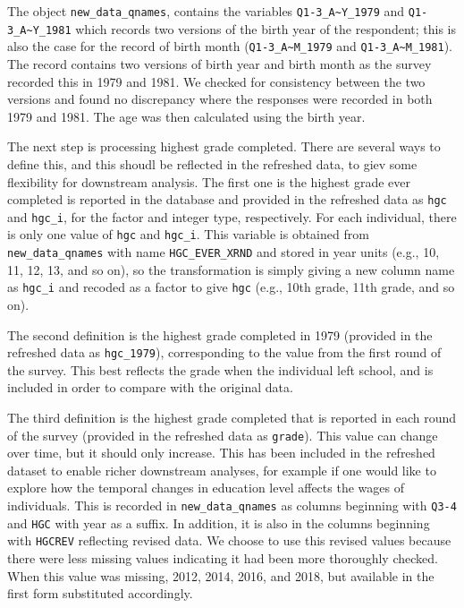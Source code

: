 \documentclass{article}
\begin{document}
The object \texttt{new\_data\_qnames}, contains the variables \texttt{Q1-3\_A\textasciitilde{}Y\_1979} and \texttt{Q1-3\_A\textasciitilde{}Y\_1981} which records two versions of the birth year of the respondent; this is also the case for the record of birth month (\texttt{Q1-3\_A\textasciitilde{}M\_1979} and \texttt{Q1-3\_A\textasciitilde{}M\_1981}). The record contains two versions of birth year and birth month as the survey recorded this in 1979 and 1981. We checked for consistency between the two versions and found no discrepancy where the responses were recorded in both 1979 and 1981. The age was then calculated using the birth year.

The next step is processing highest grade completed. There are several ways to define this, and this shoudl be reflected in the refreshed data, to giev some flexibility for downstream analysis. The first one is the highest grade ever completed is reported in the database and provided in the refreshed data as \texttt{hgc} and \texttt{hgc\_i}, for the factor and integer type, respectively. For each individual, there is only one value of \texttt{hgc} and \texttt{hgc\_i}. This variable is obtained from \texttt{new\_data\_qnames} with name \texttt{HGC\_EVER\_XRND} and stored in year units (e.g., 10, 11, 12, 13, and so on), so the transformation is simply giving a new column name as \texttt{hgc\_i} and recoded as a factor to give \texttt{hgc} (e.g., 10th grade, 11th grade, and so on).

The second definition is the highest grade completed in 1979 (provided in the refreshed data as \texttt{hgc\_1979}), corresponding to the value from the first round of the survey. This best reflects the grade when the individual left school, and is included in order to compare with the original data.

The third definition is the highest grade completed that is reported in each round of the survey (provided in the refreshed data as \texttt{grade}). This value can change over time, but it should only increase. This has been included in the refreshed dataset to enable richer downstream analyses, for example if one would like to explore how the temporal changes in education level affects the wages of individuals. This is recorded in \texttt{new\_data\_qnames} as columns beginning with \texttt{Q3-4} and \texttt{HGC} with year as a suffix. In addition, it is also in the columns beginning with \texttt{HGCREV} reflecting revised data. We choose to use this revised values because there were less missing values indicating it had been more thoroughly checked. When this value was missing, 2012, 2014, 2016, and 2018, but available in the first form substituted accordingly.
\end{document}
